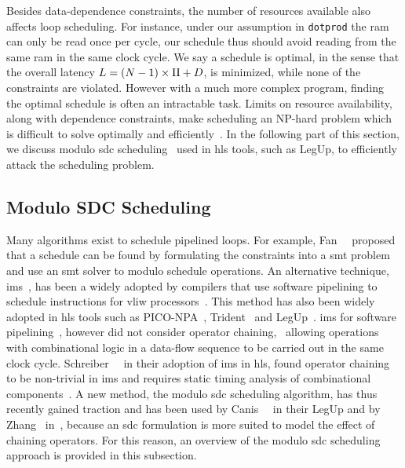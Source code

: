 Besides data-dependence constraints, the number of resources available also
affects loop scheduling.  For instance, under our assumption in \verb|dotprod|
the \gls{ram} can only be read once per cycle, our schedule thus should avoid
reading from the same \gls{ram} in the same clock cycle.  We say a schedule is
optimal, in the sense that the overall latency $L = (N - 1) \times \mathrm{II} + D$,
is minimized, while none of the constraints are violated.  However with a much
more complex program, finding the optimal schedule is often an intractable
task.  Limits on resource availability, along with dependence constraints,
make scheduling an NP-hard problem which is difficult to solve optimally and
efficiently~\cite{hwang91}.  In the following part of this section, we discuss
modulo \gls{sdc} scheduling~\cite{zhang13, canis14} used in \gls{hls} tools,
such as LegUp, to efficiently attack the scheduling problem.


\subsection{Modulo SDC Scheduling}
\label{bg:sub:sdc}

Many algorithms exist to schedule pipelined loops.  For example,
Fan~\etal~\cite{fan08} proposed that a schedule can be found by formulating
the constraints into a \gls{smt} problem and use an \gls{smt} solver to modulo
schedule operations.  An alternative technique, \gls{ims}~\cite{rau94}, has
been a widely adopted by compilers that use software pipelining to schedule
instructions for \gls{vliw} processors~\cite{mcnairy03}.  This method has also
been widely adopted in \gls{hls} tools such as PICO-NPA~\cite{schreiber02},
Trident~\cite{tripp05} and LegUp~\cite{canis13, canis14}.  \Gls{ims} for
software pipelining~\cite{rau94}, however did not consider operator chaining,
\ie~allowing operations with combinational logic in a data-flow sequence to
be carried out in the same clock cycle.  Schreiber~\etal~\cite{schreiber02}
in their adoption of \gls{ims} in \gls{hls}, found operator chaining
to be non-trivial in \gls{ims} and requires static timing analysis of
combinational components~\cite{canis14}.  A new method, the modulo \gls{sdc}
scheduling algorithm, has thus recently gained traction and has been
used by Canis~\etal~\cite{canis14} in their LegUp and by Zhang~\etal{}
in~\cite{zhang13}, because an \gls{sdc} formulation is more suited to model
the effect of chaining operators.  For this reason, an overview of the modulo
\gls{sdc} scheduling approach is provided in this subsection.

